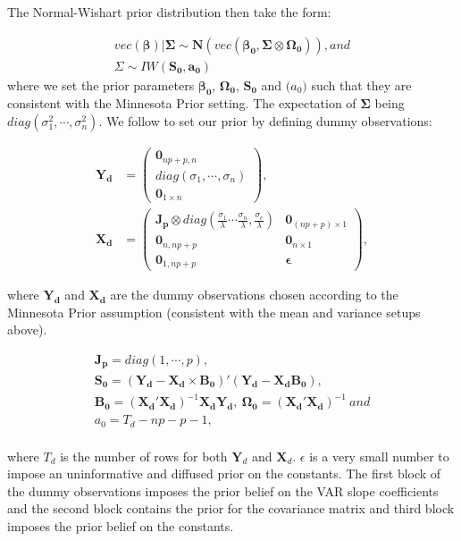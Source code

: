 \documentclass{monashthesis}
\begin{document}
The Normal-Wishart prior distribution then take the form:

\[
\begin{aligned}
vec(\bm{\beta})|\bm{\Sigma} \sim \bm{N}(vec(\bm{\beta_0},\bm{\Sigma}\otimes \bm{\Omega_0})), and\\
\Sigma \sim IW(\bm{S_0},\bm{a_0})
\end{aligned}
\]
where we set the prior parameters \(\bm{\beta_0}\), \(\bm{\Omega_0}\), \(\bm{S_0}\) and \(\bm(a_0)\) such that they are consistent with the Minnesota Prior setting.
The expectation of \(\bm{\Sigma}\) being \(diag(\sigma^2_{1},\cdots,\sigma^2_{n})\). We follow \textcite{anderson2020} to set our prior by defining dummy observations:

\[
\begin{aligned}
\bm{Y_d}&=
\begin{pmatrix}
\bm0_{np+p,n}\\
diag({\sigma_1,\cdots,\sigma_n})\\
\bm0_{1\times n}
\end{pmatrix},\\
\bm{X_d}&=
\begin{pmatrix}
\bm{J_p}\otimes diag(\frac{\sigma_1}{\lambda}\cdots\frac{\sigma_n}{\lambda},\frac{\sigma_e}{\lambda})&\bm0_{(np+p)\times1}\\
\bm 0_{n,np+p}&\bm 0_{n\times1}
\\
\bm 0_{1,np+p}&\bm{\epsilon}
\end{pmatrix},
\end{aligned}
\]

where \(\bm{Y_d}\) and \(\bm{X_d}\) are the dummy observations chosen according to the Minnesota Prior assumption (consistent with the mean and variance setups above).

\[
\begin{aligned}
\bm{J_p}=diag(1,\cdots,p),\\
\bm{S_0}=(\bm{Y_d}-\bm{X_d}\times \bm{B_0})'(\bm{Y_d}-\bm{X_d}\bm{B_0}),\\
\bm{B_0}=(\bm{X_d}'\bm{X_d})^{-1}\bm{X_d}\bm{Y_d},\ \bm{\Omega_0}=(\bm{X_d}'\bm{X_d})^{-1}\  and\\
a_0=T_d-np-p-1, \\
\end{aligned}
\]

where \(T_d\) is the number of rows for both \(\boldsymbol{Y}_d\) and \(\boldsymbol{X}_d\). \(\epsilon\) is a very small number to impose an uninformative and diffused prior on the constants. The first block of the dummy observations imposes the prior belief on the VAR slope coefficients and the second block contains the prior for the covariance matrix and third block imposes the prior belief on the constants.
\end{document}
